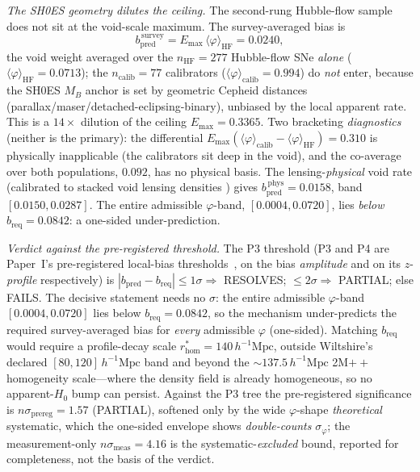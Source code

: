 \documentclass[aps,prd,twocolumn,nofootinbib,superscriptaddress,floatfix]{revtex4-2}
\newcommand{\Ho}{H_{0}}
\newcommand{\bpred}{b_{\mathrm{pred}}}
\newcommand{\breq}{b_{\mathrm{req}}}
\newcommand{\Emax}{E_{\max}}
\newcommand{\hmpc}{\,h^{-1}\mathrm{Mpc}}
\begin{document}
\emph{The SH0ES geometry dilutes the ceiling.} The second-rung Hubble-flow sample
does not sit at the void-scale maximum. The survey-averaged bias is
\begin{equation}
\bpred^{\,\mathrm{survey}}=\Emax\,\langle\varphi\rangle_{\mathrm{HF}}=0.0240,
\end{equation}
the void weight averaged over the $n_{\mathrm{HF}}=277$ Hubble-flow SNe
\emph{alone} ($\langle\varphi\rangle_{\mathrm{HF}}=0.0713$); the
$n_{\mathrm{calib}}=77$ calibrators
($\langle\varphi\rangle_{\mathrm{calib}}=0.994$) do \emph{not} enter, because the
SH0ES $M_B$ anchor is set by geometric Cepheid distances
(parallax/maser/detached-eclipsing-binary), unbiased by the local apparent rate.
This is a $14\times$ dilution of the ceiling $\Emax=0.3365$. Two bracketing
\emph{diagnostics} (neither is the primary): the differential
$\Emax(\langle\varphi\rangle_{\mathrm{calib}}-\langle\varphi\rangle_{\mathrm{HF}})=0.310$
is physically inapplicable (the calibrators sit deep in the void), and the
co-average over both populations, $0.092$, has no physical basis. The
lensing-\emph{physical} void rate (calibrated to stacked void lensing densities
\cite{ShethvdW2004,ClampittJain2015}) gives $\bpred^{\,\mathrm{phys}}=0.0158$, band
$[0.0150,0.0287]$. The entire admissible $\varphi$-band, $[0.0004,0.0720]$, lies
\emph{below} $\breq=0.0842$: a one-sided under-prediction.

\emph{Verdict against the pre-registered threshold.} The P3 threshold (P3 and P4
are Paper~I's pre-registered local-bias thresholds~\cite{Paper1}, on the bias
\emph{amplitude} and on its $z$-\emph{profile} respectively) is
$|\bpred-\breq|\le1\sigma\Rightarrow$ RESOLVES;
$\le2\sigma\Rightarrow$ PARTIAL; else FAILS. The decisive statement needs no
$\sigma$: the entire admissible $\varphi$-band $[0.0004,0.0720]$ lies below
$\breq=0.0842$, so the mechanism under-predicts the required survey-averaged bias
for \emph{every} admissible $\varphi$ (one-sided). Matching $\breq$ would require a
profile-decay scale $r_{\mathrm{hom}}^{\ast}=140\hmpc$, outside Wiltshire's
declared $[80,120]\hmpc$ band and beyond the $\sim\!137.5\hmpc$ 2M$++$ homogeneity
scale---where the density field is already homogeneous, so no apparent-$\Ho$ bump
can persist. Against the P3 tree the pre-registered significance is
$n\sigma_{\mathrm{prereg}}=1.57$ (PARTIAL), softened only by the wide
$\varphi$-shape \emph{theoretical} systematic, which the one-sided envelope shows
\emph{double-counts} $\sigma_\varphi$; the measurement-only
$n\sigma_{\mathrm{meas}}=4.16$ is the systematic-\emph{excluded} bound, reported
for completeness, not the basis of the verdict.
\end{document}
